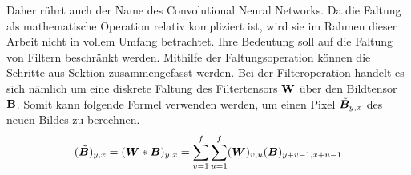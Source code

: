 Daher rührt auch der Name des Convolutional Neural Networks.
Da die Faltung als mathematische Operation relativ kompliziert ist, wird sie im
Rahmen dieser Arbeit nicht in vollem Umfang betrachtet.
Ihre Bedeutung soll auf die Faltung von Filtern beschränkt werden.
\para{}
Mithilfe der Faltungsoperation können die Schritte aus Sektion
 zusammengefasst werden.
Bei der Filteroperation handelt es sich nämlich um eine diskrete Faltung des
Filtertensors $\mathbf{W}$ über den Bildtensor $\mathbf{B}$. Somit kann
folgende Formel verwenden werden, um einen Pixel $\tilde{\bm{B}}_{y,x}$ des neuen Bildes zu berechnen.
\\
\begin{equation}
  (\tilde{\bm{B}})_{y,x} = (\bm{W} * \bm{B})_{y,x} = \sum_{v=1}^{f} \sum_{u=1}^{f} (\bm{W})_{v,u}(\bm{B})_{y+v-1,x+u-1}
\end{equation}
\para{}
